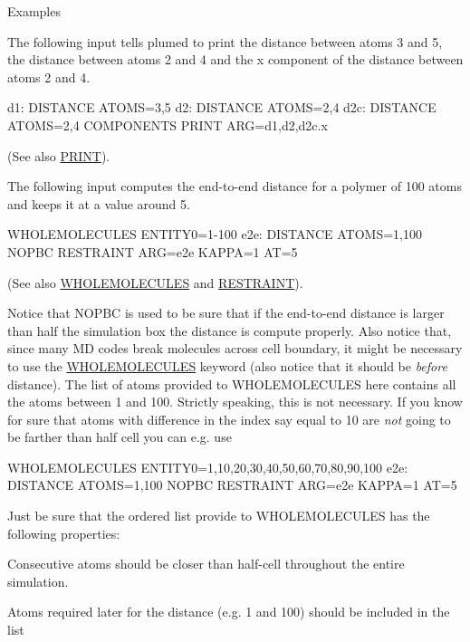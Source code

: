 \begin{DoxyParagraph}{Examples}

\end{DoxyParagraph}
The following input tells plumed to print the distance between atoms 3 and 5, the distance between atoms 2 and 4 and the x component of the distance between atoms 2 and 4. \begin{DoxyVerb}d1:  DISTANCE ATOMS=3,5
d2:  DISTANCE ATOMS=2,4
d2c: DISTANCE ATOMS=2,4 COMPONENTS
PRINT ARG=d1,d2,d2c.x
\end{DoxyVerb}
 (See also \hyperlink{PRINT}{P\+R\+I\+N\+T}).

The following input computes the end-\/to-\/end distance for a polymer of 100 atoms and keeps it at a value around 5. \begin{DoxyVerb}WHOLEMOLECULES ENTITY0=1-100
e2e: DISTANCE ATOMS=1,100 NOPBC
RESTRAINT ARG=e2e KAPPA=1 AT=5
\end{DoxyVerb}
 (See also \hyperlink{WHOLEMOLECULES}{W\+H\+O\+L\+E\+M\+O\+L\+E\+C\+U\+L\+E\+S} and \hyperlink{RESTRAINT}{R\+E\+S\+T\+R\+A\+I\+N\+T}).

Notice that N\+O\+P\+B\+C is used to be sure that if the end-\/to-\/end distance is larger than half the simulation box the distance is compute properly. Also notice that, since many M\+D codes break molecules across cell boundary, it might be necessary to use the \hyperlink{WHOLEMOLECULES}{W\+H\+O\+L\+E\+M\+O\+L\+E\+C\+U\+L\+E\+S} keyword (also notice that it should be {\itshape before} distance). The list of atoms provided to W\+H\+O\+L\+E\+M\+O\+L\+E\+C\+U\+L\+E\+S here contains all the atoms between 1 and 100. Strictly speaking, this is not necessary. If you know for sure that atoms with difference in the index say equal to 10 are {\itshape not} going to be farther than half cell you can e.\+g. use \begin{DoxyVerb}WHOLEMOLECULES ENTITY0=1,10,20,30,40,50,60,70,80,90,100
e2e: DISTANCE ATOMS=1,100 NOPBC
RESTRAINT ARG=e2e KAPPA=1 AT=5
\end{DoxyVerb}
 Just be sure that the ordered list provide to W\+H\+O\+L\+E\+M\+O\+L\+E\+C\+U\+L\+E\+S has the following properties\+:
\begin{DoxyItemize}
\item Consecutive atoms should be closer than half-\/cell throughout the entire simulation.
\item Atoms required later for the distance (e.\+g. 1 and 100) should be included in the list
\end{DoxyItemize}

